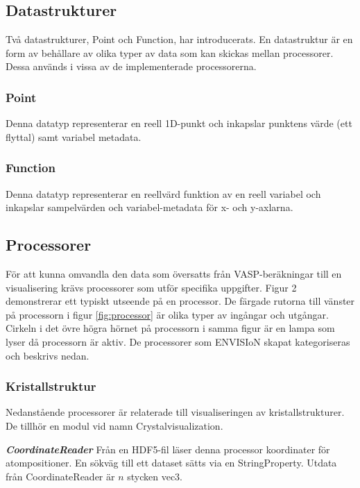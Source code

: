 \newpage
\subsection{Datastrukturer}
\label{ssec:datastrukturer}
Två datastrukturer, Point och Function, har introducerats. En datastruktur är en form av behållare av olika typer av data som kan skickas mellan processorer. Dessa används i vissa av de implementerade processorerna.
\subsubsection{Point}
Denna datatyp representerar en reell 1D-punkt och inkapslar punktens värde (ett flyttal) samt variabel metadata.
\subsubsection{Function}
Denna datatyp representerar en reellvärd funktion av en reell variabel och inkapslar sampelvärden och variabel-metadata för x- och y-axlarna.

\subsection{Processorer}
\label{ssec:processorer}
För att kunna omvandla den data som översatts från VASP-beräkningar till en visualisering krävs processorer som utför specifika uppgifter. Figur 2 demonstrerar ett typiskt utseende på en processor.
De färgade rutorna till vänster på processorn i figur \ref{fig:processor} är olika typer av ingångar och utgångar. Cirkeln i det övre högra hörnet på processorn i samma figur är en lampa som lyser då processorn är aktiv. De processorer som ENVISIoN skapat kategoriseras och beskrivs nedan.

\subsubsection{Kristallstruktur}
\label{ch:kristallstruktur-processorer}
Nedanstående processorer är relaterade till visualiseringen av kristallstrukturer. De tillhör en modul vid namn Crystalvisualization.

\textbf{\textit{CoordinateReader}} \newline
Från en HDF5-fil läser denna processor koordinater för atompositioner. En sökväg till ett dataset sätts via en StringProperty. Utdata från CoordinateReader är $n$ stycken vec3.

